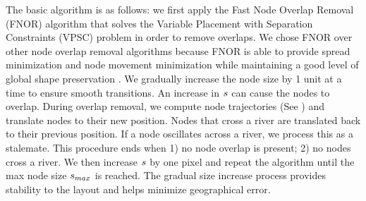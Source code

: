  The basic algorithm is as follows: we first apply the Fast Node Overlap Removal (FNOR) algorithm that solves the Variable Placement with Separation Constraints (VPSC) problem \cite{dwyer2006fast} in order to remove overlaps. We chose FNOR over other node overlap removal algorithms because FNOR is able to provide spread minimization and node movement minimization while maintaining a good level of global shape preservation \cite{chen2020Node}. We gradually increase the node size by 1 unit at a time to ensure smooth transitions. An increase in $ s $ can cause the nodes to overlap. During overlap removal, we compute node trajectories (See ) and translate nodes to their new position. Nodes that cross a river are translated back to their previous position. If a node oscillates across a river, we process this as a stalemate. This procedure ends when 1) no node overlap is present; 2) no nodes cross a river. We then increase $ s $ by one pixel and repeat the algorithm until the max node size $ s_{max} $ is reached. The gradual size increase process provides stability to the layout and helps minimize geographical error.



